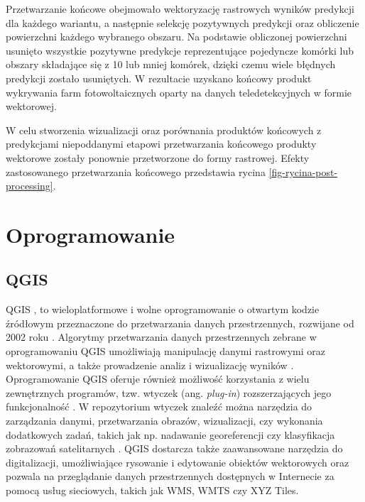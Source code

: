 \documentclass{amuthesis}
\begin{document}
Przetwarzanie końcowe obejmowało wektoryzację rastrowych wyników
predykcji dla każdego wariantu, a następnie selekcję pozytywnych
predykcji oraz obliczenie powierzchni każdego wybranego obszaru. Na
podstawie obliczonej powierzchni usunięto wszystkie pozytywne predykcje
reprezentujące pojedyncze komórki lub obszary składające się z 10 lub
mniej komórek, dzięki czemu wiele błędnych predykcji zostało usuniętych.
W rezultacie uzyskano końcowy produkt wykrywania farm fotowoltaicznych
oparty na danych teledetekcyjnych w formie wektorowej.

W celu stworzenia wizualizacji oraz porównania produktów końcowych z
predykcjami niepoddanymi etapowi przetwarzania końcowego produkty
wektorowe zostały ponownie przetworzone do formy rastrowej. Efekty
zastosowanego przetwarzania końcowego przedstawia rycina
\ref{fig-rycina-post-processing}.

\hypertarget{oprogramowanie}{%
\section{Oprogramowanie}\label{oprogramowanie}}

\hypertarget{qgis}{%
\subsection{QGIS}\label{qgis}}

QGIS \autocite{qgis}, to wieloplatformowe i wolne oprogramowanie o
otwartym kodzie źródłowym przeznaczone do przetwarzania danych
przestrzennych, rozwijane od 2002 roku
\autocite{hejmanowska_2020_dane,flenniken_2020_qgis}. Algorytmy
przetwarzania danych przestrzennych zebrane w oprogramowaniu QGIS
umożliwiają manipulację danymi rastrowymi oraz wektorowymi, a także
prowadzenie analiz i wizualizację wyników
\autocite{hejmanowska_2020_dane}. Oprogramowanie QGIS oferuje również
możliwość korzystania z wielu zewnętrznych programów, tzw. wtyczek (ang.
\emph{plug-in}) rozszerzających jego funkcjonalność
\autocite{hejmanowska_2020_dane}. W repozytorium wtyczek znaleźć można
narzędzia do zarządzania danymi, przetwarzania obrazów, wizualizacji,
czy wykonania dodatkowych zadań, takich jak np. nadawanie georeferencji
czy klasyfikacja zobrazowań satelitarnych
\autocite{hejmanowska_2020_dane}. QGIS dostarcza także zaawansowane
narzędzia do digitalizacji, umożliwiające rysowanie i edytowanie
obiektów wektorowych oraz pozwala na przeglądanie danych przestrzennych
dostępnych w Internecie za pomocą usług sieciowych, takich jak WMS, WMTS
czy XYZ Tiles.
\end{document}
